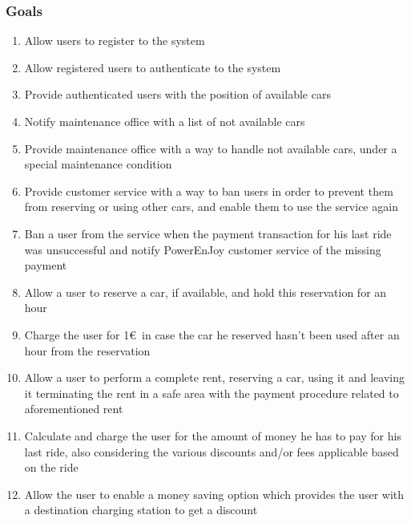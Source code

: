 	\subsubsection{Goals}
	\begin{enumerate}[label=\textbf{G\arabic*}]
		\item \label{goal:register} Allow users to register to the system
		\item \label{goal:login}Allow registered users to authenticate to the system
		\item \label{goal:position}Provide authenticated users with the position of available cars
		\item \label{goal:notifyMaintenance}Notify maintenance office with a list of not available cars 
		\item \label{goal:maintenance}Provide maintenance office with a way to handle not available cars, under a special maintenance condition 
		\item \label{goal:banUnbanUsers}Provide customer service with a way to ban users in order to prevent them from reserving or using other cars, and enable them to use the service again
		\item \label{goal:banPaymentFailed}Ban a user from the service when the payment transaction for his last ride was unsuccessful and notify PowerEnJoy customer service of the missing payment
		\item \label{goal:carReservation} Allow a user to reserve a car, if available, and hold this reservation for an hour
		\item \label{goal:reservationFee}Charge the user for 1\euro\ in case the car he reserved hasn't been used after an hour from the reservation
		\item \label{goal:completeRent}Allow a user to perform a complete rent, reserving a car, using it and leaving it terminating the rent in a safe area with the payment procedure related to aforementioned rent 
		\item \label{goal:calculateCost}Calculate and charge the user for the amount of money he has to pay for his last ride, also considering the various discounts and/or fees applicable based on the ride
		\item \label{goal:moneySavingOption}Allow the user to enable a money saving option which provides the user with a destination charging station to get a discount
	\end{enumerate}

